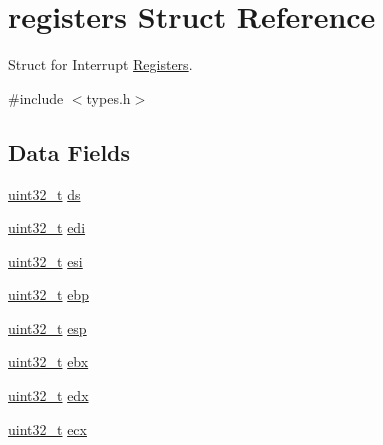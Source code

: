 \hypertarget{a00264}{}\section{registers Struct Reference}
\label{a00264}


Struct for Interrupt \hyperlink{a00260}{Registers}.  




{\ttfamily \#include $<$types.\+h$>$}

\subsection*{Data Fields}
\begin{DoxyCompactItemize}
\item 
\hyperlink{a00140_a435d1572bf3f880d55459d9805097f62_a435d1572bf3f880d55459d9805097f62}{uint32\+\_\+t} \hyperlink{a00264_a806ec3ba0cf965d456601aea4c039ec3_a806ec3ba0cf965d456601aea4c039ec3}{ds}
\item 
\hyperlink{a00140_a435d1572bf3f880d55459d9805097f62_a435d1572bf3f880d55459d9805097f62}{uint32\+\_\+t} \hyperlink{a00264_aeedcb447fe6640d43d09c27b7cb8db3b_aeedcb447fe6640d43d09c27b7cb8db3b}{edi}
\item 
\hyperlink{a00140_a435d1572bf3f880d55459d9805097f62_a435d1572bf3f880d55459d9805097f62}{uint32\+\_\+t} \hyperlink{a00264_a8da011d75d93d36da6c4cf28e1fa3179_a8da011d75d93d36da6c4cf28e1fa3179}{esi}
\item 
\hyperlink{a00140_a435d1572bf3f880d55459d9805097f62_a435d1572bf3f880d55459d9805097f62}{uint32\+\_\+t} \hyperlink{a00264_a8d156d1d27fcb1c2f2bbcce1a784431f_a8d156d1d27fcb1c2f2bbcce1a784431f}{ebp}
\item 
\hyperlink{a00140_a435d1572bf3f880d55459d9805097f62_a435d1572bf3f880d55459d9805097f62}{uint32\+\_\+t} \hyperlink{a00264_a9cc3091e4c0f25d142ac74443dc8d384_a9cc3091e4c0f25d142ac74443dc8d384}{esp}
\item 
\hyperlink{a00140_a435d1572bf3f880d55459d9805097f62_a435d1572bf3f880d55459d9805097f62}{uint32\+\_\+t} \hyperlink{a00264_aa8989b2fef42dca1d656f724eb324f51_aa8989b2fef42dca1d656f724eb324f51}{ebx}
\item 
\hyperlink{a00140_a435d1572bf3f880d55459d9805097f62_a435d1572bf3f880d55459d9805097f62}{uint32\+\_\+t} \hyperlink{a00264_af3b40afa73ecdaf2c9279b9ed482d26b_af3b40afa73ecdaf2c9279b9ed482d26b}{edx}
\item 
\hyperlink{a00140_a435d1572bf3f880d55459d9805097f62_a435d1572bf3f880d55459d9805097f62}{uint32\+\_\+t} \hyperlink{a00264_a00ce491148fd90800c18bd2d4c22e090_a00ce491148fd90800c18bd2d4c22e090}{ecx}

\end{DoxyCompactItemize}
